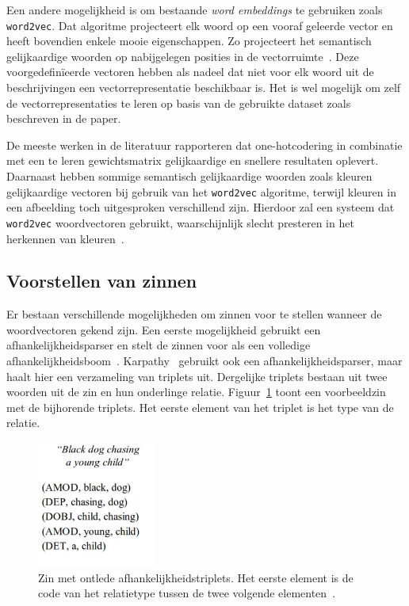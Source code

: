  Een andere mogelijkheid is om bestaande \emph{word embeddings} te gebruiken zoals \texttt{word2vec}. Dat algoritme projecteert elk woord op een vooraf geleerde vector en heeft bovendien enkele mooie eigenschappen. Zo projecteert het semantisch gelijkaardige woorden op nabijgelegen posities in de vectorruimte~\cite{Mikolov2013}. Deze voorgedefin\"ieerde vectoren hebben als nadeel dat niet voor elk woord uit de beschrijvingen een vectorrepresentatie beschikbaar is. Het is wel mogelijk om zelf de vectorrepresentaties te leren op basis van de gebruikte dataset zoals beschreven in de paper.

 De meeste werken in de literatuur rapporteren dat one-hotcodering in combinatie met een te leren gewichtsmatrix gelijkaardige en snellere resultaten oplevert. Daarnaast hebben sommige semantisch gelijkaardige woorden zoals kleuren gelijkaardige vectoren bij gebruik van het \texttt{word2vec} algoritme, terwijl kleuren in een afbeelding toch uitgesproken verschillend zijn. Hierdoor zal een systeem dat \texttt{word2vec} woordvectoren gebruikt, waarschijnlijk slecht presteren in het herkennen van kleuren~\cite{Karpathy2015}.
 
\subsection{Voorstellen van zinnen}
 Er bestaan verschillende mogelijkheden om zinnen voor te stellen wanneer de woordvectoren gekend zijn. Een eerste mogelijkheid gebruikt een afhankelijkheidsparser en stelt de zinnen voor als een volledige afhankelijkheidsboom~\cite{Socher2014}. Karpathy~\cite{Karpathy2014} gebruikt ook een afhankelijkheidsparser, maar haalt hier een verzameling van triplets uit. Dergelijke triplets bestaan uit twee woorden uit de zin en hun onderlinge relatie. Figuur~\ref{fig:deprelations} toont een voorbeeldzin met de bijhorende triplets. Het eerste element van het triplet is het type van de relatie.

 \begin{figure}[tb]
     \centering
     \includegraphics[width=0.35\textwidth]{Images/dep_relations}
     \caption[Zin met ontlede afhankelijkheidstriplets]{Zin met ontlede afhankelijkheidstriplets. Het eerste element is de code van het relatietype tussen de twee volgende elementen~\cite{Karpathy2014}.}
     \label{fig:deprelations}
 \end{figure}

